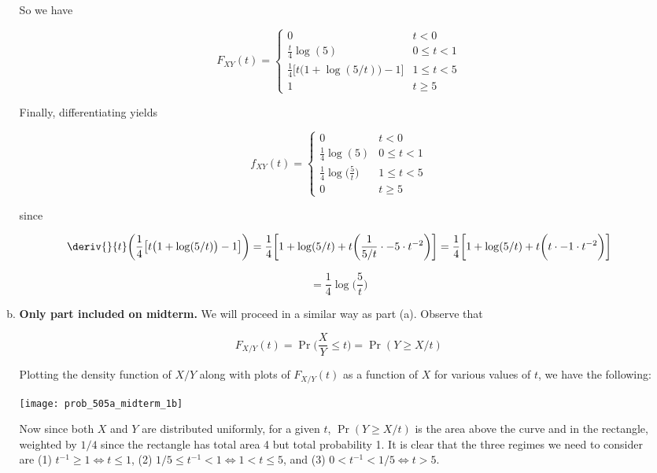 \begin{enumerate}[(1)]
\begin{enumerate}[(a)]
\begin{enumerate}[(1)]
\end{enumerate}

So we have

\[
F_{XY}(t) = \begin{cases}
0 & t <0 \\
\frac{t}{4} \log(5) & 0 \leq t < 1 \\
\frac{1}{4} \big[t \big(1+\log(5/t) \big) - 1\big] & 1 \leq t < 5 \\
1 & t \geq 5
\end{cases}
\]

Finally, differentiating yields

\[
\boxed{
f_{XY}(t) = \begin{cases}
0 & t <0 \\
\frac{1}{4} \log(5) & 0 \leq t < 1 \\
\frac{1}{4} \log \bigg( \frac{5}{t} \bigg) & 1 \leq t < 5 \\
0 & t \geq 5
\end{cases}
}
\]

since

\[
\deriv{}{t} \bigg( \frac{1}{4} \big[t \big(1+\log(5/t) \big) - 1\big]  \bigg) = \frac{1}{4} \bigg[1 + \log(5/t)  + t\bigg( \frac{1}{5/t} \cdot -5 \cdot t^{-2}  \bigg) \bigg] = \frac{1}{4} \bigg[1 + \log(5/t)  + t\bigg( t\cdot -1 \cdot t^{-2}  \bigg) \bigg] 
\]

\[
= \frac{1}{4} \log \bigg( \frac{5}{t} \bigg)
\]

\item \textbf{Only part included on midterm.} We will proceed in a similar way as part (a). Observe that

\[
F_{X/Y}(t) = \Pr\bigg(\frac{X}{Y} \leq t\bigg) = \Pr(Y \geq X/t)
\]

Plotting the density function of \(X/Y\) along with plots of \(F_{X/Y}(t)\) as a function of \(X\) for various values of \(t\), we have the following:


\begin{center}
    \texttt{[image: prob\_505a\_midterm\_1b]}
    \end{center}


Now since both \(X\) and \(Y\) are distributed uniformly, for a given \(t\), \( \Pr(Y \geq X/t)\) is the area above the curve and in the rectangle, weighted by \(1/4\) since the rectangle has total area 4 but total probability 1. It is clear that the three regimes we need to consider are (1) \(t^{-1} \geq 1 \iff  t \leq 1\), (2) \(1/5 \leq t^{-1} < 1 \iff 1 < t \leq 5\), and (3) \(0 < t^{-1} < 1/5 \iff t > 5\). 


\end{enumerate}
\end{enumerate}
